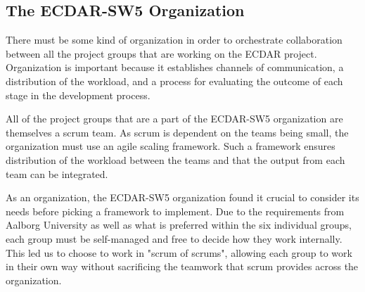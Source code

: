 \subsection{The ECDAR-SW5 Organization}\label{sub:ecdar-organization}
There must be some kind of organization in order to orchestrate collaboration between all the project groups that are working on the ECDAR project. 
Organization is important because it establishes channels of communication, a distribution of the workload, and a process for evaluating the outcome of each stage in the development process.

All of the project groups that are a part of the ECDAR-SW5 organization are themselves a scrum team. 
As scrum is dependent on the teams being small, the organization must use an agile scaling framework. 
Such a framework ensures distribution of the workload between the teams and that the output from each team can be integrated. 


As an organization, the ECDAR-SW5 organization found it crucial to consider its needs before picking a framework to implement.
Due to the requirements from Aalborg University as well as what is preferred within the six individual groups, each group must be self-managed and free to decide how they work internally.
This led us to choose to work in "scrum of scrums", allowing each group to work in their own way without sacrificing the teamwork that scrum provides across the organization.

